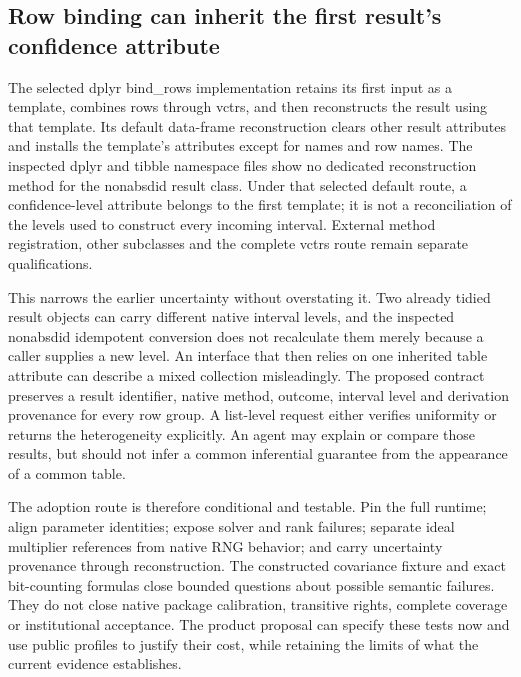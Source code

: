 \subsection{Row binding can inherit the first result's confidence attribute}

The selected dplyr bind_rows implementation retains its first input as a template, combines rows through vctrs, and then reconstructs the result using that template. Its default data-frame reconstruction clears other result attributes and installs the template's attributes except for names and row names. The inspected dplyr and tibble namespace files show no dedicated reconstruction method for the nonabsdid result class. Under that selected default route, a confidence-level attribute belongs to the first template; it is not a reconciliation of the levels used to construct every incoming interval. External method registration, other subclasses and the complete vctrs route remain separate qualifications.\citep{exec29_panel_runtime_sources}

This narrows the earlier uncertainty without overstating it. Two already tidied result objects can carry different native interval levels, and the inspected nonabsdid idempotent conversion does not recalculate them merely because a caller supplies a new level. An interface that then relies on one inherited table attribute can describe a mixed collection misleadingly. The proposed contract preserves a result identifier, native method, outcome, interval level and derivation provenance for every row group. A list-level request either verifies uniformity or returns the heterogeneity explicitly. An agent may explain or compare those results, but should not infer a common inferential guarantee from the appearance of a common table.\citep{exec29_panel_inference_sources,exec29_panel_runtime_sources}

The adoption route is therefore conditional and testable. Pin the full runtime; align parameter identities; expose solver and rank failures; separate ideal multiplier references from native RNG behavior; and carry uncertainty provenance through reconstruction. The constructed covariance fixture and exact bit-counting formulas close bounded questions about possible semantic failures. They do not close native package calibration, transitive rights, complete coverage or institutional acceptance. The product proposal can specify these tests now and use public profiles to justify their cost, while retaining the limits of what the current evidence establishes.\citep{exec29_panel_runtime_sources,exec29_panel_runtime_reference}
